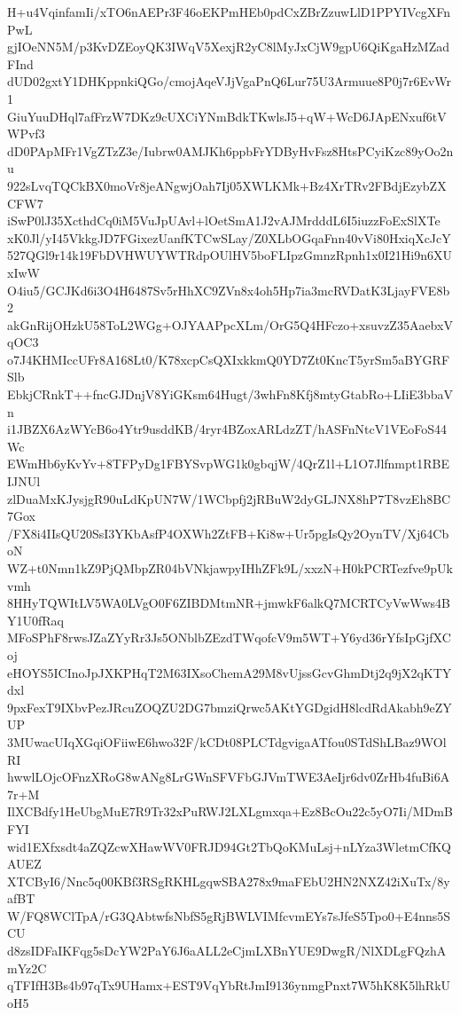 H+u4VqinfamIi/xTO6nAEPr3F46oEKPmHEb0pdCxZBrZzuwLlD1PPYIVcgXFnPwL
gjIOeNN5M/p3KvDZEoyQK3IWqV5XexjR2yC8lMyJxCjW9gpU6QiKgaHzMZadFInd
dUD02gxtY1DHKppnkiQGo/cmojAqeVJjVgaPnQ6Lur75U3Armuue8P0j7r6EvWr1
GiuYuuDHql7afFrzW7DKz9cUXCiYNmBdkTKwlsJ5+qW+WcD6JApENxuf6tVWPvf3
dD0PApMFr1VgZTzZ3e/Iubrw0AMJKh6ppbFrYDByHvFsz8HtsPCyiKzc89yOo2nu
922sLvqTQCkBX0moVr8jeANgwjOah7Ij05XWLKMk+Bz4XrTRv2FBdjEzybZXCFW7
iSwP0lJ35XcthdCq0iM5VuJpUAvl+lOetSmA1J2vAJMrdddL6I5iuzzFoExSlXTe
xK0Jl/yI45VkkgJD7FGixezUanfKTCwSLay/Z0XLbOGqaFnn40vVi80HxiqXcJcY
527QGl9r14k19FbDVHWUYWTRdpOUlHV5boFLIpzGmnzRpnh1x0I21Hi9n6XUxIwW
O4iu5/GCJKd6i3O4H6487Sv5rHhXC9ZVn8x4oh5Hp7ia3mcRVDatK3LjayFVE8b2
akGnRijOHzkU58ToL2WGg+OJYAAPpcXLm/OrG5Q4HFczo+xsuvzZ35AaebxVqOC3
o7J4KHMIccUFr8A168Lt0/K78xcpCsQXIxkkmQ0YD7Zt0KncT5yrSm5aBYGRFSlb
EbkjCRnkT++fncGJDnjV8YiGKsm64Hugt/3whFn8Kfj8mtyGtabRo+LIiE3bbaVn
i1JBZX6AzWYcB6o4Ytr9usddKB/4ryr4BZoxARLdzZT/hASFnNtcV1VEoFoS44Wc
EWmHb6yKvYv+8TFPyDg1FBYSvpWG1k0gbqjW/4QrZ1l+L1O7Jlfnmpt1RBEIJNUl
zlDuaMxKJysjgR90uLdKpUN7W/1WCbpfj2jRBuW2dyGLJNX8hP7T8vzEh8BC7Gox
/FX8i4IIsQU20SsI3YKbAsfP4OXWh2ZtFB+Ki8w+Ur5pgIsQy2OynTV/Xj64CboN
WZ+t0Nmn1kZ9PjQMbpZR04bVNkjawpyIHhZFk9L/xxzN+H0kPCRTezfve9pUkvmh
8HHyTQWItLV5WA0LVgO0F6ZIBDMtmNR+jmwkF6alkQ7MCRTCyVwWws4BY1U0fRaq
MFoSPhF8rwsJZaZYyRr3Js5ONblbZEzdTWqofcV9m5WT+Y6yd36rYfsIpGjfXCoj
eHOYS5ICInoJpJXKPHqT2M63IXsoChemA29M8vUjssGcvGhmDtj2q9jX2qKTYdxl
9pxFexT9IXbvPezJRcuZOQZU2DG7bmziQrwc5AKtYGDgidH8lcdRdAkabh9eZYUP
3MUwacUIqXGqiOFiiwE6hwo32F/kCDt08PLCTdgvigaATfou0STdShLBaz9WOlRI
hwwlLOjcOFnzXRoG8wANg8LrGWnSFVFbGJVmTWE3AeIjr6dv0ZrHb4fuBi6A7r+M
IlXCBdfy1HeUbgMuE7R9Tr32xPuRWJ2LXLgmxqa+Ez8BcOu22c5yO7Ii/MDmBFYI
wid1EXfxsdt4aZQZcwXHawWV0FRJD94Gt2TbQoKMuLsj+nLYza3WletmCfKQAUEZ
XTCByI6/Nnc5q00KBf3RSgRKHLgqwSBA278x9maFEbU2HN2NXZ42iXuTx/8yafBT
W/FQ8WClTpA/rG3QAbtwfsNbfS5gRjBWLVIMfcvmEYs7sJfeS5Tpo0+E4nns5SCU
d8zsIDFaIKFqg5sDcYW2PaY6J6aALL2eCjmLXBnYUE9DwgR/NlXDLgFQzhAmYz2C
qTFIfH3Bs4b97qTx9UHamx+EST9VqYbRtJmI9136ynmgPnxt7W5hK8K5lhRkUoH5

